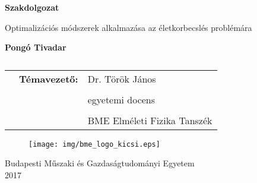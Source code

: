 \documentclass[12pt]{article}
\begin{document}

\begin{titlepage}
	\centering
	{\Huge\bfseries Szakdolgozat\par}
	\vspace{1cm}
	\vspace{1cm}
	{\LARGE Optimalizációs módszerek alkalmazása
		az életkorbecslés problémára \par}
	\vspace{3cm}
	{\huge\bfseries Pongó Tivadar\\\par}
	\vspace{3cm}
	\begin{table}[H]
		\centering
		\begin{tabular}{ccl}
			&	\LARGE\textbf{Témavezető:} &\Large Dr. Török János \\
			& &\\
			& &\Large egyetemi docens \\
			& &\\
			& &\Large BME Elméleti Fizika Tanszék \\
			
		\end{tabular}
		\caption*{}
		\label{t1}
	\end{table}
	\vfill
	\begin{figure}[H]
		\centering
		\texttt{[image: img/bme\_logo\_kicsi.eps]}
	\end{figure} 
	{\large Budapesti Műszaki és Gazdaságtudományi Egyetem\\ 2017 \par}
\end{titlepage}
\onehalfspacing
\iffalse
\end{document}
